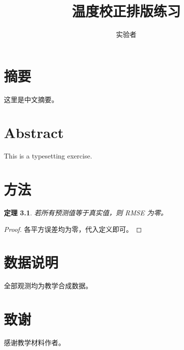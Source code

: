 \documentclass[UTF8,fontset=fandol,openany]{ctexbook}
\title{温度校正排版练习}\author{实验者}\date{}
\newtheorem{theorem}{定理}[chapter]
\begin{document}
\frontmatter
\maketitle
\chapter{摘要}这里是中文摘要。\chapter{Abstract}This is a typesetting exercise.
\tableofcontents\listoffigures\listoftables
\mainmatter
\chapter{方法}\label{chap:method}
\begin{theorem}若所有预测值等于真实值，则 RMSE 为零。\end{theorem}
\begin{proof}各平方误差均为零，代入定义即可。\end{proof}
\appendix
\chapter{数据说明}全部观测均为教学合成数据。
\backmatter
\chapter{致谢}感谢教学材料作者。
\end{document}
